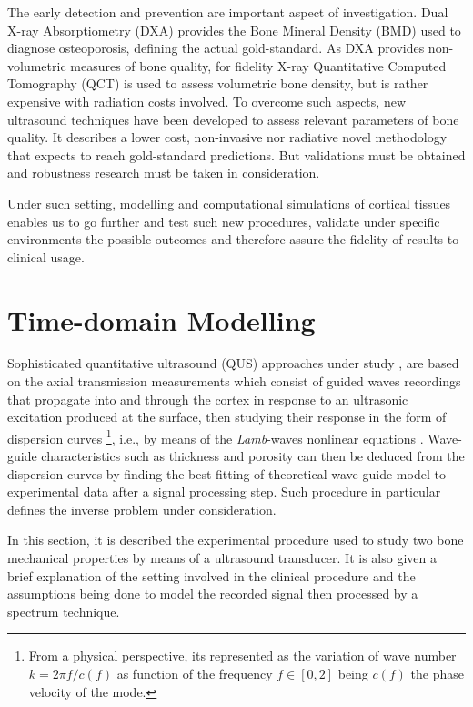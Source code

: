 The early detection and prevention are important aspect of investigation. Dual X-ray Absorptiometry (DXA) provides the Bone Mineral Density (BMD) used to diagnose osteoporosis, defining the actual gold-standard.
As DXA provides non-volumetric measures of bone quality, for fidelity X-ray Quantitative Computed Tomography (QCT) is used to assess volumetric bone density, but is rather expensive with radiation costs involved. To overcome such aspects, new ultrasound techniques have been developed to assess relevant parameters of bone quality. It describes a lower cost, non-invasive nor radiative novel methodology that expects to reach gold-standard predictions. But validations must be obtained and robustness research must be taken in consideration.

Under such setting, modelling and computational simulations of cortical tissues enables us to go further and test such new  procedures, validate under specific environments the possible outcomes and therefore assure the fidelity of results to clinical usage.


\section{Time-domain Modelling}

Sophisticated quantitative ultrasound (QUS) approaches under study \cite{Foiret2014} \cite{Minonzio2018}, are based on the axial transmission measurements which consist of guided waves recordings that propagate into and through the cortex in response to an ultrasonic excitation produced at the surface, then studying their response in the form of dispersion curves \footnote{From a physical perspective, its represented as the variation of wave number $k = 2 \pi f/c(f)$ as function of the frequency $f \in [0, 2]$ being $c(f)$ the phase velocity of the mode.}, i.e., by means of the \textit{Lamb}-waves nonlinear equations \cite{Rhee2007}.
Wave-guide characteristics such as thickness and porosity can then be deduced from the dispersion curves by finding the best fitting of theoretical wave-guide model to experimental data after a signal processing step. Such procedure in particular defines the inverse problem under consideration.

In this section, it is described the experimental procedure used to study two bone mechanical properties by means of a ultrasound transducer.
It is also given a brief explanation of the setting involved in the clinical procedure and the assumptions being done to model the recorded signal then processed by a spectrum technique. 

